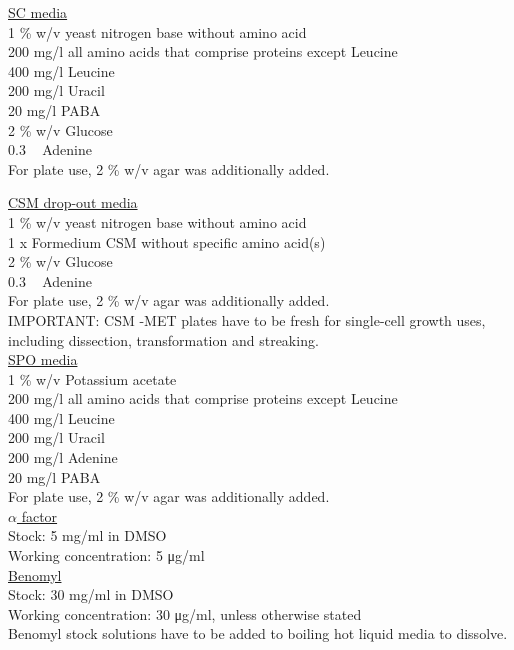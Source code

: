 \underline{SC media} \\
1 \% w/v yeast nitrogen base without amino acid \\
200 \si{\milli\gram/\litre} all amino acids that comprise proteins except Leucine \\
400 \si{\milli\gram/\litre} Leucine \\
200 \si{\milli\gram/\litre} Uracil \\
20 \si{\milli\gram/\litre} PABA \\
2 \% w/v Glucose \\ 
0.3 \si{\milli\Molar} Adenine\\
For plate use, 2 \% w/v agar was additionally added. \\


\underline{CSM drop-out media} \\
1 \% w/v yeast nitrogen base without amino acid \\
1 x Formedium CSM without specific amino acid(s)\\
2 \% w/v Glucose \\ 
0.3 \si{\milli\Molar} Adenine\\
For plate use, 2 \% w/v agar was additionally added. \\
IMPORTANT: CSM -MET plates have to be fresh for single-cell growth uses, including dissection, transformation and streaking. \\

\underline{SPO media}\\
1 \% w/v Potassium acetate\\
200 \si{\milli\gram/\litre} all amino acids that comprise proteins except Leucine \\
400 \si{\milli\gram/\litre} Leucine \\
200 \si{\milli\gram/\litre} Uracil \\
200 \si{\milli\gram/\litre} Adenine\\
20 \si{\milli\gram/\litre} PABA \\
For plate use, 2 \% w/v agar was additionally added. \\

\underline{$\alpha$ factor}\\
Stock: 5 \si{\milli\gram/\milli\litre} in DMSO \\
Working concentration: 5 \si{\micro\gram/\milli\litre}\\

\underline{Benomyl} \\
Stock: 30 \si{\milli\gram/\milli\litre} in DMSO \\ 
Working concentration: 30 \si{\micro\gram/\milli\litre}, unless otherwise stated \\
Benomyl stock solutions have to be added to boiling hot liquid media to dissolve. \\


